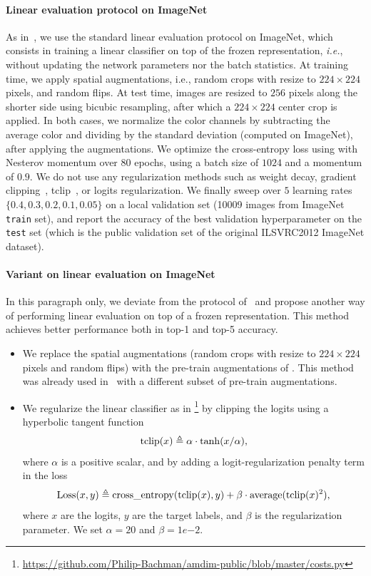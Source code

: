 \paragraph{Linear evaluation protocol on ImageNet}
\label{app:linear_eval_details}
As in~\cite{kolesnikov2019revisiting,kornblith2019better,SimCLR,MOCOv2}, we use the standard linear evaluation protocol on ImageNet, which consists in training a linear classifier on top of the frozen representation, \emph{i.e.}, without updating the network parameters nor the batch statistics. At training time, we apply spatial augmentations, i.e., random crops with resize to $224 \times 224$ pixels, and random flips. At test time, images are resized to $256$ pixels along the shorter side using bicubic resampling, after which a $224 \times 224$ center crop is applied. In both cases, we normalize the color channels by subtracting the average color and dividing by the standard deviation (computed on ImageNet), after applying the augmentations. We optimize the cross-entropy loss using \SGD with Nesterov momentum over $80$ epochs, using a batch size of $1024$ and a momentum of $0.9$. We do not use any regularization methods such as weight decay, gradient clipping~\cite{pascanu2013difficulty}, tclip~\cite{AMDIM}, or logits regularization. We finally sweep over $5$ learning rates $\{0.4, 0.3, 0.2, 0.1, 0.05\}$ on a local validation set (10009 images from ImageNet \texttt{train} set), and report the accuracy of the best validation hyperparameter on the \texttt{test} set (which is the public validation set of the original ILSVRC2012 ImageNet dataset).


\paragraph{Variant on linear evaluation on ImageNet}
In this paragraph only, we deviate from the protocol of~\cite{SimCLR,MOCOv2} and
propose another way of performing linear evaluation on top of a frozen representation. This method achieves better performance both in top-1 and top-5 accuracy. 

\begin{itemize}[leftmargin=*]
    \item We replace the spatial augmentations (random crops with resize to $224 \times 224$ pixels and random flips) with the pre-train augmentations of . This method was already used in~\cite{CPCv2} with a different subset of pre-train augmentations. 
    \item We regularize the linear classifier as in  \cite{AMDIM}\footnote{\url{https://github.com/Philip-Bachman/amdim-public/blob/master/costs.py}} by clipping the logits using a hyperbolic tangent function 
\[ {\rm tclip}(x) \triangleq \alpha \cdot \tanh( x / \alpha),\] where $\alpha$  is a positive scalar, and by adding a logit-regularization penalty term in the loss
\[
{\rm Loss}(x,y) \triangleq {\rm cross\_entropy}({\rm tclip}(x), y) + \beta \cdot {\rm average}({\rm tclip}(x)^2), 
\] 
where $x$ are the logits, $y$ are the target labels, and $\beta$ is the regularization parameter. We set $\alpha=20$ and $\beta=1e{-2}$.
\end{itemize}
 
